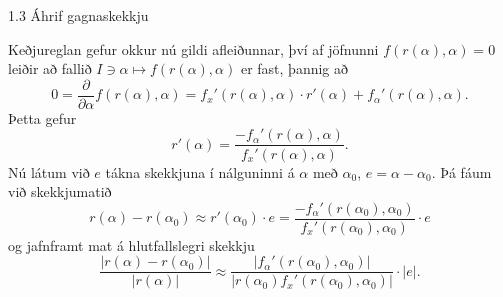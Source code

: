 \begin{frame}{1.3 Áhrif gagnaskekkju} 


Keðjureglan gefur okkur nú gildi
afleiðunnar, því af jöfnunni $f(r(\alpha),\alpha)=0$ 
leiðir að fallið $I \ni \alpha \mapsto f(r(\alpha),\alpha)$ er fast, 
þannig að 
\begin{equation*}
    0 =\frac {\partial}{\partial \alpha}f(r(\alpha),\alpha) = f_x'(r(\alpha), \alpha)\cdot r'(\alpha) 
    + f_{\alpha}'(r(\alpha),
    \alpha).
\end{equation*}\pause
Þetta gefur
\begin{equation*}
    r'(\alpha) = \frac{-f_{\alpha}'(r(\alpha),\alpha)}
        {f_x'(r(\alpha),\alpha)}.
\end{equation*}\pause
Nú látum við $e$ tákna skekkjuna í nálguninni á $\alpha$ með
$\alpha_0$, $e=\alpha-\alpha_0$. Þá fáum við skekkjumatið
\begin{equation*}
    r(\alpha) - r(\alpha_0) \approx r'(\alpha_0)\cdot e 
    = \frac{-f_{\alpha}'(r(\alpha_0),\alpha_0)}
        {f_x'(r(\alpha_0),\alpha_0)}\cdot e
\end{equation*}
\pause
og jafnframt mat á hlutfallslegri skekkju
\begin{equation*}
    \dfrac{|r(\alpha) - r(\alpha_0)|}
    {|r(\alpha)|} \approx \frac{|f_{\alpha}'(r(\alpha_0),\alpha_0)|}
    {|r(\alpha_0)f_x'(r(\alpha_0),\alpha_0)|}\cdot
    |e|. 
\end{equation*}
\end{frame}
%

